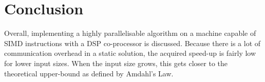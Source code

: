 \section{Conclusion}
Overall, implementing a highly parallelisable algorithm on a machine capable 
of SIMD instructions with a DSP co-processor is discussed. Because there is a 
lot of communication overhead in a static solution, the acquired speed-up is 
fairly low for lower input sizes. When the input size grows, this gets closer 
to the theoretical upper-bound as defined by Amdahl's Law. 
